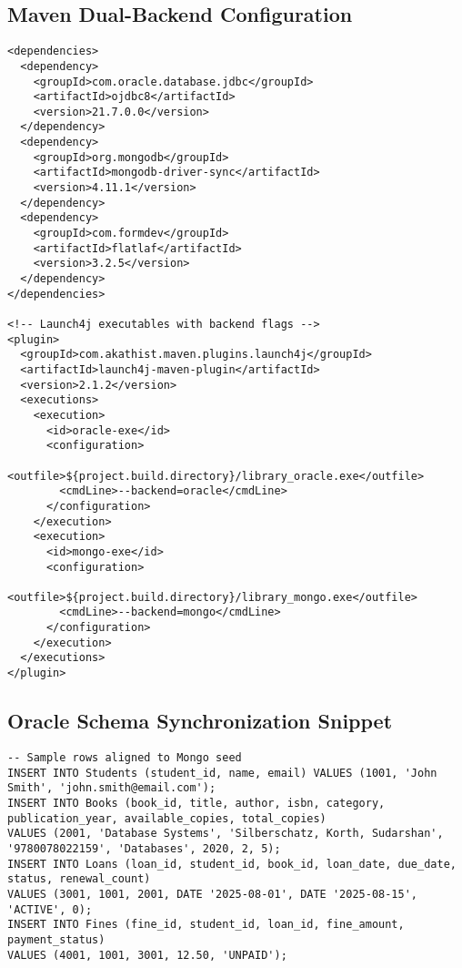\documentclass[12pt,a4paper]{article}
\begin{document}
\subsection{Maven Dual-Backend Configuration}
\begin{lstlisting}[style=java, caption=Maven dependencies and packaging]
<dependencies>
  <dependency>
    <groupId>com.oracle.database.jdbc</groupId>
    <artifactId>ojdbc8</artifactId>
    <version>21.7.0.0</version>
  </dependency>
  <dependency>
    <groupId>org.mongodb</groupId>
    <artifactId>mongodb-driver-sync</artifactId>
    <version>4.11.1</version>
  </dependency>
  <dependency>
    <groupId>com.formdev</groupId>
    <artifactId>flatlaf</artifactId>
    <version>3.2.5</version>
  </dependency>
</dependencies>

<!-- Launch4j executables with backend flags -->
<plugin>
  <groupId>com.akathist.maven.plugins.launch4j</groupId>
  <artifactId>launch4j-maven-plugin</artifactId>
  <version>2.1.2</version>
  <executions>
    <execution>
      <id>oracle-exe</id>
      <configuration>
        <outfile>${project.build.directory}/library_oracle.exe</outfile>
        <cmdLine>--backend=oracle</cmdLine>
      </configuration>
    </execution>
    <execution>
      <id>mongo-exe</id>
      <configuration>
        <outfile>${project.build.directory}/library_mongo.exe</outfile>
        <cmdLine>--backend=mongo</cmdLine>
      </configuration>
    </execution>
  </executions>
</plugin>
\end{lstlisting}

\subsection{Oracle Schema Synchronization Snippet}
\begin{lstlisting}[style=sql, caption=Oracle schema and sample data]
-- Sample rows aligned to Mongo seed
INSERT INTO Students (student_id, name, email) VALUES (1001, 'John Smith', 'john.smith@email.com');
INSERT INTO Books (book_id, title, author, isbn, category, publication_year, available_copies, total_copies)
VALUES (2001, 'Database Systems', 'Silberschatz, Korth, Sudarshan', '9780078022159', 'Databases', 2020, 2, 5);
INSERT INTO Loans (loan_id, student_id, book_id, loan_date, due_date, status, renewal_count)
VALUES (3001, 1001, 2001, DATE '2025-08-01', DATE '2025-08-15', 'ACTIVE', 0);
INSERT INTO Fines (fine_id, student_id, loan_id, fine_amount, payment_status)
VALUES (4001, 1001, 3001, 12.50, 'UNPAID');
\end{lstlisting}
\end{document}
